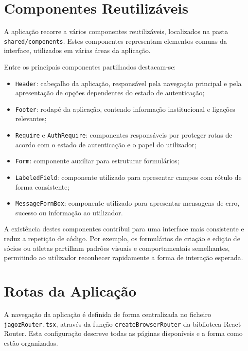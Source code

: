 \section{Componentes Reutilizáveis}

A aplicação recorre a vários componentes reutilizáveis, localizados na pasta
\texttt{shared/components}. Estes componentes representam elementos comuns da
interface, utilizados em várias áreas da aplicação.

Entre os principais componentes partilhados destacam-se:

\begin{itemize}
    \item \texttt{Header}: cabeçalho da aplicação, responsável pela navegação
    principal e pela apresentação de opções dependentes do estado de
    autenticação;
    \item \texttt{Footer}: rodapé da aplicação, contendo informação institucional
    e ligações relevantes;
    \item \texttt{Require} e \texttt{AuthRequire}: componentes responsáveis por
    proteger rotas de acordo com o estado de autenticação e o papel do
    utilizador;
    \item \texttt{Form}: componente auxiliar para estruturar formulários;
    \item \texttt{LabeledField}: componente utilizado para apresentar campos com
    rótulo de forma consistente;
    \item \texttt{MessageFormBox}: componente utilizado para apresentar mensagens
    de erro, sucesso ou informação ao utilizador.
\end{itemize}

A existência destes componentes contribui para uma interface mais consistente e
reduz a repetição de código. Por exemplo, os formulários de criação e edição de
sócios ou atletas partilham padrões visuais e comportamentais semelhantes,
permitindo ao utilizador reconhecer rapidamente a forma de interação esperada.

\section{Rotas da Aplicação}

A navegação da aplicação é definida de forma centralizada no ficheiro
\texttt{jagozRouter.tsx}, através da função \texttt{createBrowserRouter} da
biblioteca React Router. Esta configuração descreve todas as páginas
disponíveis e a forma como estão organizadas.

